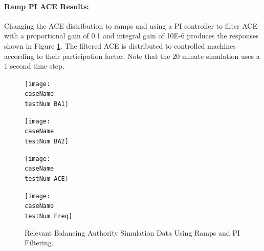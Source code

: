 \documentclass[12pt]{article}
\begin{document}
\paragraph{Ramp PI ACE Results:} Changing the ACE distribution to ramps and using a PI controller to filter ACE with a proportional gain of 0.1 and integral gain of 10E-6 produces the responses shown in Figure \ref{PI 0 Results}. The filtered ACE is distributed to controlled machines according to their participation factor. Note that the 20 minute simulation uses a 1 second time step.
\renewcommand{\testNum}{0}
\begin{figure}[h!]
		\centering
		\texttt{[image: \\caseName\\testNum BA1]}\vspace{-1em}
\end{figure}\vspace{-1.5em}
\begin{figure}[h!]
		\centering
		\texttt{[image: \\caseName\\testNum BA2]}\vspace{-1em}
\end{figure}\vspace{-1.5em}
\begin{figure}[h!]
		\centering
		\texttt{[image: \\caseName\\testNum ACE]}\vspace{-1em}
\end{figure}\vspace{-1.5em}
\begin{figure}[h!]
		\centering
		\texttt{[image: \\caseName\\testNum Freq]}\vspace{-1em}
		\caption{Relevant Balancing Authority Simulation Data Using Ramps and PI Filtering.}
		\label{PI 0 Results}		 
\end{figure}\vspace{-1.5em}

\pagebreak
\end{document}
